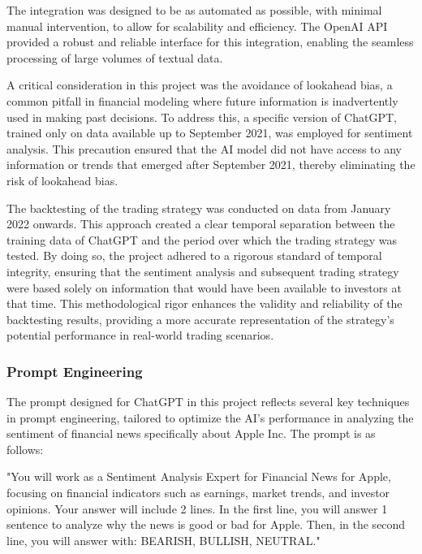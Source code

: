 The integration was designed to be as automated as possible, with minimal manual intervention, to allow for scalability and efficiency. The OpenAI API provided a robust and reliable interface for this integration, enabling the seamless processing of large volumes of textual data.

A critical consideration in this project was the avoidance of lookahead bias, a common pitfall in financial modeling where future information is inadvertently used in making past decisions. To address this, a specific version of ChatGPT, trained only on data available up to September 2021, was employed for sentiment analysis. This precaution ensured that the AI model did not have access to any information or trends that emerged after September 2021, thereby eliminating the risk of lookahead bias.

The backtesting of the trading strategy was conducted on data from January 2022 onwards. This approach created a clear temporal separation between the training data of ChatGPT and the period over which the trading strategy was tested. By doing so, the project adhered to a rigorous standard of temporal integrity, ensuring that the sentiment analysis and subsequent trading strategy were based solely on information that would have been available to investors at that time. This methodological rigor enhances the validity and reliability of the backtesting results, providing a more accurate representation of the strategy's potential performance in real-world trading scenarios.

\subsubsection{Prompt Engineering}
The prompt designed for ChatGPT in this project reflects several key techniques in prompt engineering, tailored to optimize the AI's performance in analyzing the sentiment of financial news specifically about Apple Inc. The prompt is as follows:

"You will work as a Sentiment Analysis Expert for Financial News for Apple, focusing on financial indicators such as earnings, market trends, and investor opinions. Your answer will include 2 lines. In the first line, you will answer 1 sentence to analyze why the news is good or bad for Apple. Then, in the second line, you will answer with: BEARISH, BULLISH, NEUTRAL."

